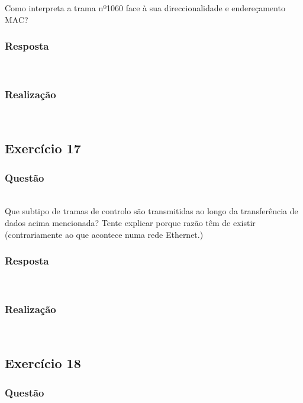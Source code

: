 \documentclass{llncs}
\begin{document}
Como interpreta a trama nº1060 face à sua direccionalidade e endereçamento MAC?

\subsubsection{Resposta}\rule[-10pt]{0pt}{10pt}\\



\subsubsection{Realização}\rule[-10pt]{0pt}{10pt}\\



\clearpage
\subsection{Exercício 17}
\subsubsection{Questão}\rule[-10pt]{0pt}{10pt}\\

Que subtipo de tramas de controlo são transmitidas ao longo da transferência de dados acima mencionada? Tente explicar porque razão têm de existir (contrariamente ao que acontece numa rede Ethernet.)

\subsubsection{Resposta}\rule[-10pt]{0pt}{10pt}\\



\subsubsection{Realização}\rule[-10pt]{0pt}{10pt}\\



\clearpage
\subsection{Exercício 18}
\subsubsection{Questão}\rule[-10pt]{0pt}{10pt}\\
\end{document}

